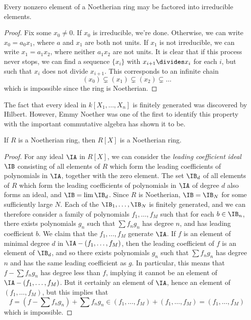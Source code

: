 \begin{theorem}
    Every nonzero element of a Noetherian ring may be factored into irreducible elements.
\end{theorem}
\begin{proof}
    Fix some $x_0 \neq 0$. If $x_0$ is irreducible, we're done. Otherwise, we can write $x_0 = a_0x_1$, where $a$ and $x_1$ are both not units. If $x_1$ is not irreducible, we can write $x_1 = a_1x_2$, where neither $a_1x_2$ are not units. It is clear that if this process never stops, we can find a sequence $\{ x_i \}$ with $x_{i+1} \divides x_i$ for each $i$, but such that $x_i$ does not divide $x_{i+1}$. This corresponds to an infinite chain
    \[ (x_0) \subsetneq (x_1) \subsetneq (x_2) \subsetneq \dots \]
    which is impossible since the ring is Noetherian.
\end{proof}

The fact that every ideal in $k[X_1, \dots, X_n]$ is finitely generated was discovered by Hilbert. However, Emmy Noether was one of the first to identify this property with the important commutative algebra has shown it to be.

\begin{theorem}
    If $R$ is a Noetherian ring, then $R[X]$ is a Noetherian ring.
\end{theorem}
\begin{proof}
    For any ideal $\IA$ in $R[X]$, we can consider the {\it leading coefficient ideal} $\IB$ consisting of all elements of $R$ which form the leading coefficients of polynomials in $\IA$, together with the zero element. The set $\IB_d$ of all elements of $R$ which form the leading coefficients of polynomials in $\IA$ of degree $d$ also forms an ideal, and $\IB = \lim \IB_d$. Since $R$ is Noetherian, $\IB = \IB_N$ for some sufficiently large $N$. Each of the $\IB_1, \dots, \IB_N$ is finitely generated, and we can therefore consider a family of polynomials $f_1, \dots, f_M$ such that for each $b \in \IB_n$, there exists polynomials $g_n$ such that $\sum f_n g_n$ has degree $n$, and has leading coefficient $b$. We claim that the $f_1, \dots, f_M$ generate $\IA$. If $f$ is an element of minimal degree $d$ in $\IA - (f_1, \dots, f_M)$, then the leading coefficient of $f$ is an element of $\IB_d$, and so there exists polynomials $g_n$ such that $\sum f_n g_n$ has degree $n$ and has the same leading coefficient as $g$. In particular, this means that $f - \sum f_n g_n$ has degree less than $f$, implying it cannot be an element of $\IA - (f_1, \dots, f_M)$. But it certainly an element of $\IA$, hence an element of $(f_1, \dots, f_M)$, but this implies that
    \[ f = (f - \sum f_n g_n) + \sum f_n g_n \in (f_1, \dots, f_M) + (f_1, \dots, f_M) = (f_1, \dots, f_M) \]
    which is impossible.
\end{proof}

